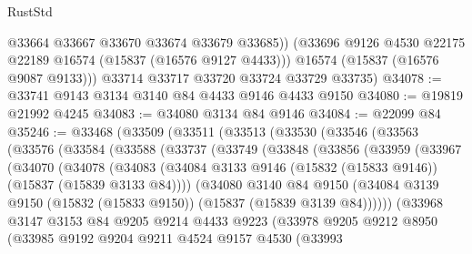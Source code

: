 \begin{lexlean}{RustStd}
\begin{coremodule}
{\begin{coremodule}
{{{{{{{{{{{{{{{{{{{{{{{{{{{{{{{{{{{{{{{{{{{{{{{{{{{{{{{{{{{{            @33664
            @33667
            @33670
            @33674
            @33679
            @33685))
        (@33696 @9126 @4530 @22175 @22189 @16574 (@15837 (@16576 @9127 @4433)))
        @16574
        (@15837 (@16576 @9087 @9133)))
      @33714
      @33717
      @33720
      @33724
      @33729
      @33735)
@34078 := @33741 @9143 @3134 @3140 @84 @4433 @9146 @4433 @9150
@34080 := @19819 @21992 @4245
@34083 := @34080 @3134 @84 @9146
@34084 := @22099 @84
@35246 := @33468
    (@33509
      (@33511
        (@33513
          (@33530
            (@33546
              (@33563
                (@33576
                  (@33584
                    (@33588
                      (@33737
                        (@33749
                          (@33848
                            (@33856
                              (@33959
                                (@33967
                                  (@34070
                                    (@34078
                                      (@34083
                                        (@34084
                                          @3133
                                          @9146
                                          (@15832 (@15833 @9146))
                                          (@15837 (@15839 @3133 @84))))
                                      (@34080
                                        @3140
                                        @84
                                        @9150
                                        (@34084
                                          @3139
                                          @9150
                                          (@15832 (@15833 @9150))
                                          (@15837 (@15839 @3139 @84))))))
                                  (@33968
                                    @3147
                                    @3153
                                    @84
                                    @9205
                                    @9214
                                    @4433
                                    @9223
                                    (@33978
                                      @9205
                                      @9212
                                      @8950
                                      (@33985
                                        @9192
                                        @9204
                                        @9211
                                        @4524
                                        @9157
                                        @4530
                                        (@33993
}}}}}}}}}}}}}}}}}}}}}}}}}}}}}}}}}}}}}}}}}}}}}}}}}}}}}}}}}}}}
\end{coremodule}}
\end{coremodule}
\end{lexlean}
